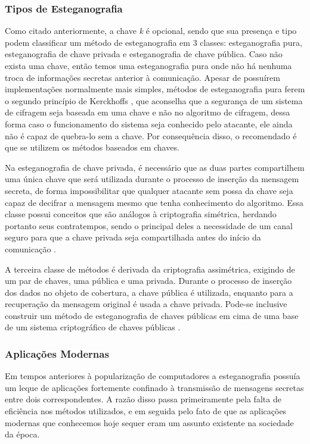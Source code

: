 \subsubsection{Tipos de Esteganografia}

Como citado anteriormente, a chave \textit{k} é opcional, sendo que sua presença e tipo podem classificar um método de esteganografia em 3 classes: esteganografia pura, esteganografia de chave privada e esteganografia de chave pública. Caso não exista uma chave, então temos uma esteganografia pura onde não há nenhuma troca de informações secretas anterior à comunicação. Apesar de possuírem implementações normalmente mais simples, métodos de esteganografia pura ferem o segundo princípio de Kerckhoffs \cite{Kerckhoffs1883}, que aconselha que a segurança de um sistema de cifragem seja baseada em uma chave e não no algoritmo de cifragem, dessa forma caso o funcionamento do sistema seja conhecido pelo atacante, ele ainda não é capaz de quebra-lo sem a chave. Por consequência disso, o recomendado é que se utilizem os métodos baseados em chaves.

 Na esteganografia de chave privada, é necessário que as duas partes compartilhem uma única chave que será utilizada durante o processo de inserção da mensagem secreta, de forma impossibilitar que qualquer atacante sem possa da chave seja capaz de decifrar a mensagem mesmo que tenha conhecimento do algoritmo. Essa classe possui conceitos que são análogos à criptografia simétrica, herdando portanto seus contratempos, sendo o principal deles a necessidade de um canal seguro para que a chave privada seja compartilhada antes do início da comunicação \cite{anderson}.

 A terceira classe de métodos é derivada da criptografia assimétrica, exigindo de um par de chaves, uma pública e uma privada. Durante o processo de inserção dos dados no objeto de cobertura, a chave pública é utilizada, enquanto para a recuperação da mensagem original é usada a chave privada. Pode-se inclusive construir um método de esteganografia de chaves públicas em cima de uma base de um sistema criptográfico de chaves públicas \cite{anderson}.

 \subsubsection{Aplicações Modernas}

 Em tempos anteriores à popularização de computadores a esteganografia possuía um leque de aplicações fortemente confinado à transmissão de mensagens secretas entre dois correspondentes. A razão disso passa primeiramente pela falta de eficiência nos métodos utilizados, e em seguida pelo fato de que as aplicações modernas que conhecemos hoje sequer eram um assunto existente na sociedade da época.
 
